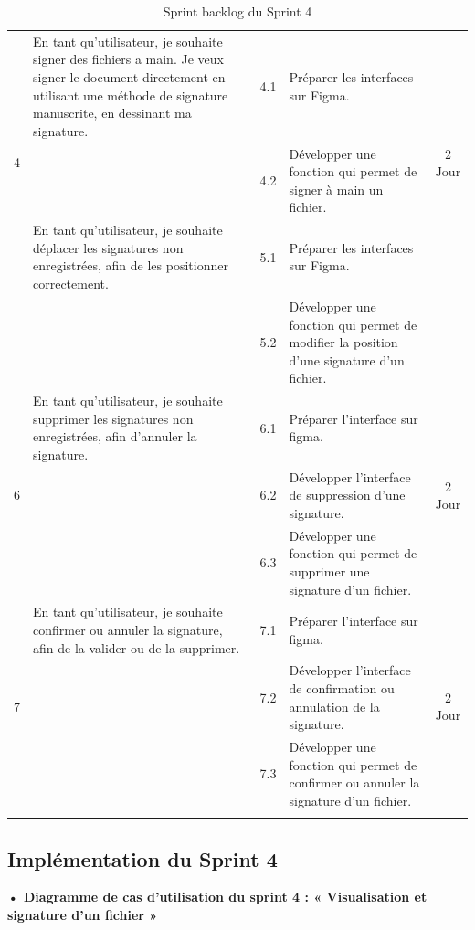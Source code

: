 \begin{adjustwidth}{-1cm}{}
\begin{longtable}{|c|p{6cm}|c|p{6cm}|c|}
      \multirow{3}{*}{4} & En tant qu'utilisateur, je souhaite signer des fichiers a main. Je veux signer le document directement en utilisant une méthode de signature manuscrite, en dessinant ma signature. & 4.1 & Préparer les interfaces sur Figma. & \multirow{3}{*}{2 Jour} \\
      \cline{3-4}
      & & 4.2 & Développer une fonction qui permet de signer à main un fichier. & \\
      \cline{1-5}

      \multirow{3}{*}{5} & En tant qu'utilisateur, je souhaite déplacer les signatures non enregistrées, afin de les positionner correctement.& 5.1 & Préparer les interfaces sur Figma. & \multirow{3}{*}{2 Jour} \\
      \cline{3-4}
      & & 5.2 & Développer une fonction qui permet de modifier la position d'une signature d'un fichier. & \\
      \cline{1-5}

      \multirow{3}{*}{6} & En tant qu'utilisateur, je souhaite supprimer les signatures non enregistrées, afin d'annuler la signature.& 6.1 & Préparer l'interface sur figma. & \multirow{3}{*}{2 Jour} \\
      \cline{3-4}
      & & 6.2 & Développer l'interface de suppression d'une signature. & \\
      & & 6.3 & Développer une fonction qui permet de supprimer une signature d'un fichier. & \\
      \cline{1-5}

      \multirow{3}{*}{7} & En tant qu'utilisateur, je souhaite confirmer ou annuler la signature, afin de la valider ou de la supprimer.& 7.1 & Préparer l'interface sur figma. & \multirow{3}{*}{2 Jour} \\
      \cline{3-4}
      & & 7.2 & Développer l'interface de confirmation ou annulation de la signature. & \\
      & & 7.3 & Développer une fonction qui permet de confirmer ou annuler la signature d'un fichier. & \\
      \cline{1-5}
      
  \hline
  \caption{Sprint backlog du Sprint 4}
  \label{tab:sprint-backlog-4}
\end{longtable}
\end{adjustwidth}

\subsection{Implémentation du Sprint 4}
\textbf{•	Diagramme de cas d'utilisation du sprint 4 : « Visualisation et signature d'un fichier »}

